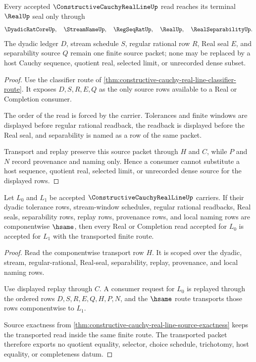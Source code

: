 \begin{theorem}
\label{thm:constructive-cauchy-real-line-source-exactness}
Every accepted $\ConstructiveCauchyRealLineUp$ read reaches its terminal $\RealUp$ seal only through
$$
\DyadicRatCoreUp,\quad \StreamNameUp,\quad \RegSeqRatUp,\quad \RealUp,\quad \RealSeparabilityUp .
$$
The dyadic ledger $D$, stream schedule $S$, regular rational row $R$, Real seal $E$, and separability source $Q$ remain one finite source packet; none may be replaced by a host Cauchy sequence, quotient real, selected limit, or unrecorded dense subset.
\end{theorem}
\begin{proof}
Use the classifier route of \autoref{thm:constructive-cauchy-real-line-classifier-route}. It exposes $D,S,R,E,Q$ as the only source rows available to a Real or Completion consumer.

The order of the read is forced by the carrier. Tolerances and finite windows are displayed before regular rational readback, the readback is displayed before the Real seal, and separability is named as a row of the same packet.

Transport and replay preserve this source packet through $H$ and $C$, while $P$ and $N$ record provenance and naming only. Hence a consumer cannot substitute a host sequence, quotient real, selected limit, or unrecorded dense source for the displayed rows.
\end{proof}

\begin{theorem}
\label{thm:constructive-cauchy-real-line-transport-stability}
Let $L_0$ and $L_1$ be accepted $\ConstructiveCauchyRealLineUp$ carriers. If their dyadic tolerance rows, stream-window schedules, regular rational readbacks, Real seals, separability rows, replay rows, provenance rows, and local naming rows are componentwise $\hsame$, then every Real or Completion read accepted for $L_0$ is accepted for $L_1$ with the transported finite route.
\end{theorem}
\begin{proof}
Read the componentwise transport row $H$. It is scoped over the dyadic, stream, regular-rational, Real-seal, separability, replay, provenance, and local naming rows.

Use displayed replay through $C$. A consumer request for $L_0$ is replayed through the ordered rows $D,S,R,E,Q,H,P,N$, and the $\hsame$ route transports those rows componentwise to $L_1$.

Source exactness from \autoref{thm:constructive-cauchy-real-line-source-exactness} keeps the transported read inside the same finite route. The transported packet therefore exports no quotient equality, selector, choice schedule, trichotomy, host equality, or completeness datum.
\end{proof}

